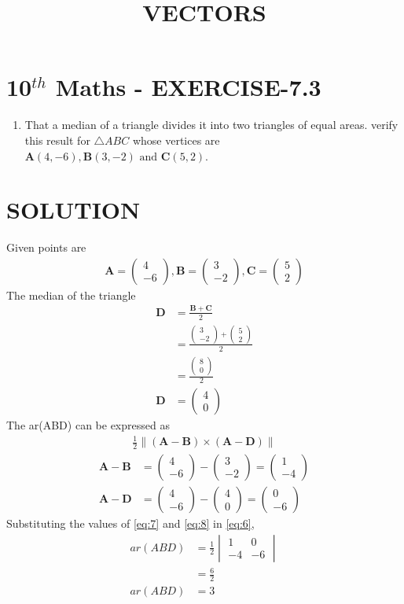 \documentclass[12pt]{article}
\newcommand{\mydet}[1]{\ensuremath{\begin{vmatrix}#1\end{vmatrix}}}
\providecommand{\brak}[1]{\ensuremath{\left(#1\right)}}
\newcommand{\myvec}[1]{\ensuremath{\begin{pmatrix}#1\end{pmatrix}}}
\providecommand{\norm}[1]{\left\lVert#1\right\rVert}
\let\vec\mathbf
\begin{document}
\begin{center}
\title{\textbf{VECTORS}}
\date{\vspace{-5ex}} %
\maketitle
\end{center}

\section{10$^{th}$ Maths - EXERCISE-7.3}

\begin{enumerate}
\item That a median of a triangle divides it into two triangles  of equal areas. verify this result for $\triangle ABC$ whose vertices are $\vec{A}(4,-6),\vec{B}(3,-2)\text{ and }\vec{C}(5,2)$.
\end{enumerate}

\section{SOLUTION}
Given points are
\begin{align}
\vec{A}=\myvec{4\\ -6} ,
\vec{B}=\myvec{3\\ -2} ,
\vec{C}=\myvec{5\\ 2}
\end{align}
The median of the triangle 
\begin{align}
\vec{D}&=\frac{\vec{B}+\vec{C}}{2}\\
&=\frac{\myvec{3\\ -2}+\myvec{5\\ 2}}{2}\\
&=\frac{\myvec{8\\ 0}}{2}\\
\vec{D}&=\myvec{4\\ 0}
\end{align}
The ar(ABD) can be expressed as
 \begin{align}
  \frac{1}{2} \norm{\brak{\vec{A}-\vec{B}}  \times 
   \brak{\vec{A}- \vec{D}}} \label{eq:6} 
\end{align}
\begin{align}
	\vec{A}- \vec{B} &= \myvec{4\\ -6}-\myvec{3\\ -2}=\myvec{1\\ -4}\label{eq:7}\\
	  \vec{A}- \vec{D} &= \myvec{4\\ -6}-\myvec{4\\ 0}=\myvec{0\\ -6}\label{eq:8}
  \end{align}
Substituting the values of \eqref{eq:7} and \eqref{eq:8} in \eqref{eq:6},
\begin{align}
	ar(ABD)&=\frac{1}{2}\mydet{1 & 0\\-4 & -6}\\  
	       &=	\frac{6}{2}\\
	ar(ABD)&=3
\end{align}
\end{document}

